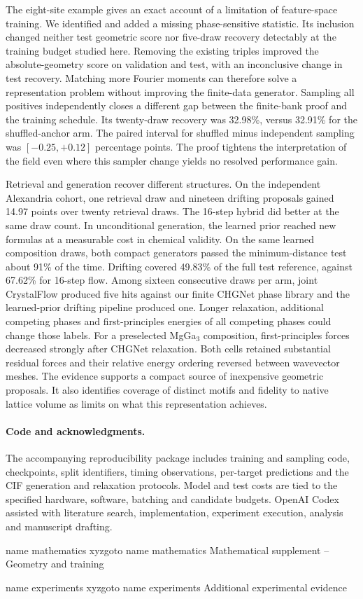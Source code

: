 \documentclass[10pt]{article}
\newcommand{\crytalmark}[2]{\pdfdest name {#1} xyz\pdfoutline goto name {#1} {#2}}
\newcommand{\crytalmark}[2]{\pdfbookmark[1]{#2}{#1}}
\begin{document}
The eight-site example gives an exact account of a limitation of feature-space training. We identified and added a missing phase-sensitive statistic. Its inclusion changed neither test geometric score nor five-draw recovery detectably at the training budget studied here. Removing the existing triples improved the absolute-geometry score on validation and test, with an inconclusive change in test recovery. Matching more Fourier moments can therefore solve a representation problem without improving the finite-data generator. Sampling all positives independently closes a different gap between the finite-bank proof and the training schedule. Its twenty-draw recovery was 32.98\%, versus 32.91\% for the shuffled-anchor arm. The paired interval for shuffled minus independent sampling was $[-0.25,+0.12]$ percentage points. The proof tightens the interpretation of the field even where this sampler change yields no resolved performance gain.

Retrieval and generation recover different structures. On the independent Alexandria cohort, one retrieval draw and nineteen drifting proposals gained 14.97 points over twenty retrieval draws. The 16-step hybrid did better at the same draw count. In unconditional generation, the learned prior reached new formulas at a measurable cost in chemical validity. On the same learned composition draws, both compact generators passed the minimum-distance test about 91\% of the time. Drifting covered 49.83\% of the full test reference, against 67.62\% for 16-step flow. Among sixteen consecutive draws per arm, joint CrystalFlow produced five hits against our finite CHGNet phase library and the learned-prior drifting pipeline produced one. Longer relaxation, additional competing phases and first-principles energies of all competing phases could change those labels. For a preselected MgGa$_3$ composition, first-principles forces decreased strongly after CHGNet relaxation. Both cells retained substantial residual forces and their relative energy ordering reversed between wavevector meshes. The evidence supports a compact source of inexpensive geometric proposals. It also identifies coverage of distinct motifs and fidelity to native lattice volume as limits on what this representation achieves.

\paragraph{Code and acknowledgments.} The accompanying reproducibility package includes training and sampling code, checkpoints, split identifiers, timing observations, per-target predictions and the CIF generation and relaxation protocols. Model and test costs are tied to the specified hardware, software, batching and candidate budgets. OpenAI Codex assisted with literature search, implementation, experiment execution, analysis and manuscript drafting.

\clearpage
\crytalmark{mathematics}{Mathematical supplement -- Geometry and training}

\clearpage
\appendix
\crytalmark{experiments}{Additional experimental evidence}
\end{document}
